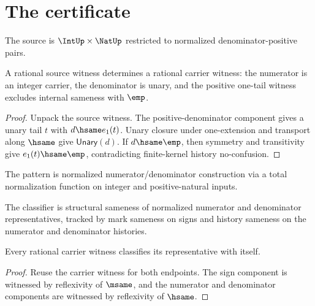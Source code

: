 \section{The certificate}

\begin{definition}
\label{def:rat-source-specification}
The source is \(\IntUp \times \NatUp\) restricted to normalized denominator-positive pairs.
\end{definition}

\begin{theorem}
\label{thm:rat-source-spec-to-carrier}
A rational source witness determines a rational carrier witness: the numerator
is an integer carrier, the denominator is unary, and the positive one-tail
witness excludes internal sameness with \(\emp\).
\end{theorem}
\begin{proof}
Unpack the source witness. The positive-denominator component gives a unary
tail \(t\) with \(d \hsame e_1(t)\). Unary closure under one-extension and
transport along \(\hsame\) give \(\mathsf{Unary}(d)\). If \(d\hsame \emp\),
then symmetry and transitivity give \(e_1(t)\hsame \emp\), contradicting
finite-kernel history no-confusion.
\end{proof}

\begin{definition}
\label{def:rat-pattern-specification}
The pattern is normalized numerator/denominator construction via a total normalization function on integer and positive-natural inputs.
\end{definition}

\begin{definition}
\label{def:rat-classifier-specification}
The classifier is structural sameness of normalized numerator and denominator representatives, tracked by mark sameness on signs and history sameness on the numerator and denominator histories.
\end{definition}

\begin{theorem}
\label{thm:rat-classifier-reflexivity}
Every rational carrier witness classifies its representative with itself.
\end{theorem}
\begin{proof}
Reuse the carrier witness for both endpoints. The sign component is witnessed by reflexivity of \(\msame\), and the numerator and denominator components are witnessed by reflexivity of \(\hsame\).
\end{proof}


